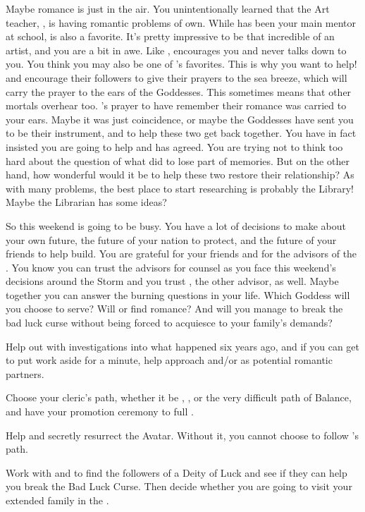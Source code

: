 \documentclass[char]{GL2020}
\begin{document}
Maybe romance is just in the air. You unintentionally learned that the Art teacher, \cChupAvenger{\full}, is having romantic problems of \cChupAvenger{\their} own. While \cFlowPriest{} has been your main mentor at school, \cChupAvenger{} is also a favorite. It's pretty impressive to be that incredible of an artist, and you are a bit in awe. Like \cBunker{}, \cChupAvenger{} encourages you and never talks down to you. You think you may also be one of \cChupAvenger{}’s favorites. This is why you want to help! \cEbb{} and \cFlow{} encourage their followers to give their prayers to the sea breeze, which will carry the prayer to the ears of the Goddesses. This sometimes means that other mortals overhear too. \cChupAvenger{}'s prayer to have \cHeadScientist{\full} remember their romance was carried to your ears. Maybe it was just coincidence, or maybe the Goddesses have sent you to be their instrument, and to help these two get back together. You have in fact insisted you are going to help and \cChupAvenger{} has agreed. You are trying not to think too hard about the question of what \cHeadScientist{} did to lose part of \cHeadScientist{\their} memories. But on the other hand, how wonderful would it be to help these two restore their relationship? As with many problems, the best place to start researching is probably the Library! Maybe the Librarian \cLibrarian{\full} has some ideas?

So this weekend is going to be busy. You have a lot of decisions to make about your own future, the future of your nation to protect, and the future of your friends to help build. You are grateful for your friends and for the advisors of the \pShip{}. You know you can trust the \pShippie{} advisors for counsel as you face this weekend’s decisions around the Storm and you trust \cChupLeader{\full}, the other advisor, as well. Maybe together you can answer the burning questions in your life. Which Goddess will you choose to serve? Will \cPresident{} or \cChupAvenger{} find romance? And will you manage to break the bad luck curse without being forced to acquiesce to your \pFarm{} family's demands?

\begin{itemz}
    \item Help \cPresident{} out with \cPresident{\their} investigations into what happened six years ago, and if you can get \cPresident{\them} to put work aside for a minute, help \cPresident{\them} approach \cHeir{} and/or \cChupStudent{} as potential romantic partners.
    \item Choose your cleric's path, whether it be \cEbbFull{\full}, \cFlowFull{\full}, or the very difficult path of Balance, and have your promotion ceremony to full \cInitiate{\cleric}.
    \item Help \cFlowPriest{} and \cEbbPriest{} secretly resurrect the \cEbb{} Avatar. Without it, you cannot choose to follow \cEbb{}'s path.
    \item Work with \cPresident{} and \cWarlordDaughter{} to find the followers of a Deity of Luck and see if they can help you break the Bad Luck Curse. Then decide whether you are going to visit your extended family in the \pFarm{}.
\end{itemz}
\end{document}

